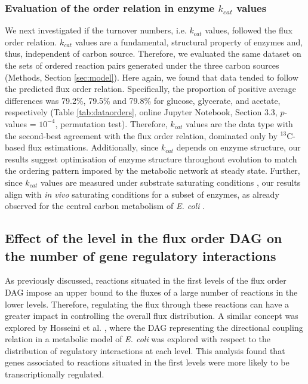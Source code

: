 \documentclass[12pt]{article}
\begin{document}
\subsubsection{Evaluation of the order relation in enzyme $k_{cat}$ values}
We next investigated if the turnover numbers, i.e. $k_{cat}$ values, followed the flux order relation. $k_{cat}$ values are a fundamental, structural property of enzymes and, thus, independent of carbon source. Therefore, we evaluated the same dataset on the sets of ordered reaction pairs generated under the three carbon sources (Methods, Section \ref{sec:model}). Here again, we found that data tended to follow the predicted flux order relation. Specifically, the proportion of positive average differences was 79.2\%, 79.5\% and 79.8\% for glucose, glycerate, and acetate, respectively (Table \ref{tab:dataorders}, online Jupyter Notebook, Section 3.3, $p$-values = $10^{-4}$, permutation test). Therefore, $k_{cat}$ values are the data type with the second-best agreement with the flux order relation,  dominated only by ${}^{13}\mathrm{C}$-based flux estimations.  Additionally, since $k_{cat}$ depends on enzyme structure, our results suggest optimisation of enzyme structure throughout evolution to match the ordering pattern imposed by the metabolic network at steady state. Further, since $k_{cat}$ values are measured under substrate saturating conditions \cite{Davidi2016}, our results align with \emph{in vivo} saturating conditions for a subset of enzymes, as already observed for the central carbon metabolism of \emph{E. coli} \cite{Bennett2009a}.

\subsection{Effect of the level in the flux order DAG on the number of gene regulatory interactions}
As previously discussed, reactions situated in the first levels of the flux order DAG impose an upper bound to the fluxes of a large number of reactions in the lower levels. Therefore, regulating the flux through these reactions can have a greater impact in controlling the overall flux distribution. A similar concept was explored by Hosseini et al. \cite{Hosseini2015}, where the DAG representing the directional coupling relation in a metabolic model of \emph{E. coli} was explored with respect to the distribution of regulatory interactions at each level. This analysis found that genes associated to reactions situated in the first levels were more likely to be transcriptionally regulated.
\end{document}
